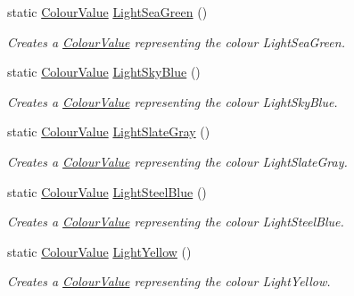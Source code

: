 \begin{DoxyCompactItemize}
static \hyperlink{classMezzanine_1_1ColourValue}{ColourValue} \hyperlink{classMezzanine_1_1ColourValue_ac87e088fd7cc1e0bc16f55de96292261}{LightSeaGreen} ()
\begin{DoxyCompactList}\small\item\em Creates a \hyperlink{classMezzanine_1_1ColourValue}{ColourValue} representing the colour LightSeaGreen. \item\end{DoxyCompactList}\item 
static \hyperlink{classMezzanine_1_1ColourValue}{ColourValue} \hyperlink{classMezzanine_1_1ColourValue_a62111c4f1265efc2401134f73a5e608e}{LightSkyBlue} ()
\begin{DoxyCompactList}\small\item\em Creates a \hyperlink{classMezzanine_1_1ColourValue}{ColourValue} representing the colour LightSkyBlue. \item\end{DoxyCompactList}\item 
static \hyperlink{classMezzanine_1_1ColourValue}{ColourValue} \hyperlink{classMezzanine_1_1ColourValue_a5eba38a58cc04d94c9ef8319d9a9de1a}{LightSlateGray} ()
\begin{DoxyCompactList}\small\item\em Creates a \hyperlink{classMezzanine_1_1ColourValue}{ColourValue} representing the colour LightSlateGray. \item\end{DoxyCompactList}\item 
static \hyperlink{classMezzanine_1_1ColourValue}{ColourValue} \hyperlink{classMezzanine_1_1ColourValue_a1537641fc78d7c772d8fb5426ce6b030}{LightSteelBlue} ()
\begin{DoxyCompactList}\small\item\em Creates a \hyperlink{classMezzanine_1_1ColourValue}{ColourValue} representing the colour LightSteelBlue. \item\end{DoxyCompactList}\item 
static \hyperlink{classMezzanine_1_1ColourValue}{ColourValue} \hyperlink{classMezzanine_1_1ColourValue_a9d938822554fde58fac60699698462d2}{LightYellow} ()
\begin{DoxyCompactList}\small\item\em Creates a \hyperlink{classMezzanine_1_1ColourValue}{ColourValue} representing the colour LightYellow. \item\end{DoxyCompactList}\item 

\end{DoxyCompactItemize}
